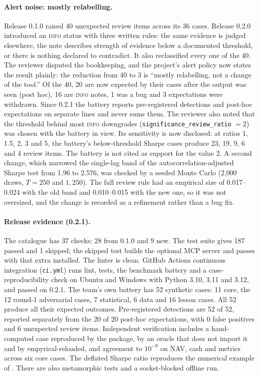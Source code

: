 \documentclass[11pt]{article}
\begin{document}
\paragraph{Alert noise: mostly relabelling.} Release 0.1.0 raised 40 unexpected review items across its 36 cases. Release 0.2.0 introduced an \textsc{info} status with three written rules: the same evidence is judged elsewhere, the note describes strength of evidence below a documented threshold, or there is nothing declared to contradict. It also reclassified every one of the 40. The reviewer disputed the bookkeeping, and the project's alert policy now states the result plainly: the reduction from 40 to 3 is ``mostly relabelling, not a change of the tool.'' Of the 40, 20 are now expected by their cases after the output was seen (post hoc), 16 are \textsc{info} notes, 1 was a bug and 3 expectations were withdrawn. Since 0.2.1 the battery reports pre-registered detections and post-hoc expectations on separate lines and never sums them. The reviewer also noted that the threshold behind most \textsc{info} downgrades (\texttt{significance\_review\_ratio} $=2$) was chosen with the battery in view. Its sensitivity is now disclosed: at ratios 1, 1.5, 2, 3 and 5, the battery's below-threshold Sharpe cases produce 23, 19, 9, 6 and 4 review items. The battery is not cited as support for the value 2. A second change, which narrowed the single-lag band of the autocorrelation-adjusted Sharpe test from 1.96 to 2.576, was checked by a seeded Monte Carlo (2{,}000 draws, $T=250$ and $1{,}250$). The full review rule had an empirical size of 0.017--0.024 with the old band and 0.010--0.015 with the new one, so it was not oversized, and the change is recorded as a refinement rather than a bug fix.

\paragraph{Release evidence (0.2.1).} The catalogue has 37 checks: 28 from 0.1.0 and 9 new. The test suite gives 187 passed and 1 skipped; the skipped test builds the optional MCP server and passes with that extra installed. The linter is clean. GitHub Actions continuous integration (\texttt{ci.yml}) runs lint, tests, the benchmark battery and a case-reproducibility check on Ubuntu and Windows with Python 3.10, 3.11 and 3.12, and passed on 0.2.1. The team's own battery has 52 synthetic cases: 11 core, the 12 round-1 adversarial cases, 7 statistical, 6 data and 16 lesson cases. All 52 produce all their expected outcomes. Pre-registered detections are 52 of 52, reported separately from the 20 of 20 post-hoc expectations, with 0 false positives and 6 unexpected review items. Independent verification includes a hand-computed case reproduced by the package, by an oracle that does not import it and by empyrical-reloaded, and agreement to $10^{-9}$ on NAV, cash and metrics across six core cases. The deflated Sharpe ratio reproduces the numerical example of \citet{BaileyLopezDePrado2014}. There are also metamorphic tests and a socket-blocked offline run.
\end{document}
